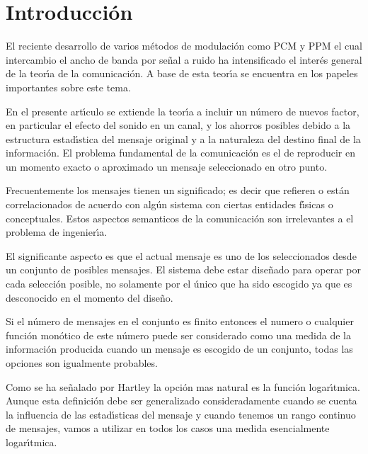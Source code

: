 \chapter{Introducci\'{o}n}

El reciente desarrollo de varios m\'{e}todos de modulaci\'{o}n como
PCM y PPM el cual intercambio el ancho de banda por se\~{n}al a ruido
ha intensificado el inter\'{e}s general de la teor\'{\i}a de la
comunicaci\'{o}n. A base de esta teor\'{\i}a se encuentra en los
papeles importantes \citet{Nyquist}
\citet{Hartley} sobre este tema.

En el presente art\'{\i}culo se extiende la teor\'{\i}a a incluir un
n\'{u}mero de nuevos factor, en particular el efecto del sonido en un
canal, y los ahorros posibles debido a la estructura estad\'{\i}stica
del mensaje original y a la naturaleza del destino final de la
informaci\'{o}n. El problema fundamental de la comunicaci\'{o}n es el
de reproducir en un momento exacto o aproximado un mensaje
seleccionado en otro punto.

Frecuentemente los mensajes tienen un significado; es decir que
refieren o est\'{a}n correlacionados de acuerdo con alg\'{u}n sistema con
ciertas entidades f\'{\i}sicas o conceptuales. Estos aspectos
semanticos de la comunicaci\'{o}n son irrelevantes a el problema de
ingenier\'{\i}a.

El significante aspecto es que el actual mensaje es uno de los
seleccionados desde un conjunto de posibles mensajes. El sistema debe
estar dise\~{n}ado para operar por cada selecci\'{o}n posible, no
solamente por el \'{u}nico que ha sido escogido ya que es desconocido
en el momento del dise\~{n}o.

Si el n\'{u}mero de mensajes en el conjunto es finito entonces el
numero o cualquier funci\'{o}n mon\'{o}tico de este n\'{u}mero puede
ser considerado como una medida de la informaci\'{o}n producida cuando
un mensaje es escogido de un conjunto, todas las opciones son
igualmente probables.

Como se ha se\~{n}alado por Hartley la opci\'{o}n mas natural es la
funci\'{o}n logar\'{\i}tmica. Aunque esta definici\'{o}n debe ser
generalizado consideradamente cuando se cuenta la influencia de las
estad\'{\i}sticas del mensaje y cuando tenemos un rango continuo de
mensajes, vamos a utilizar en todos los casos una medida esencialmente
logar\'{\i}tmica.

